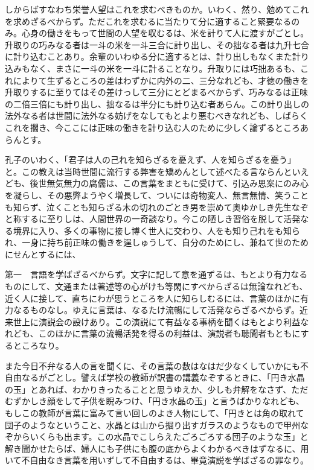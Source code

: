 \documentclass[a4paper, platex, dvipdfmx]{jsarticle}
\begin{document}
しからばすなわち栄誉人望はこれを求むべきものか。いわく、然り、勉めてこれを求めざるべからず。ただこれを求むるに当たりて分に適すること緊要なるのみ。心身の働きをもって世間の人望を収むるは、米を計りて人に渡すがごとし。升取りの巧みなる者は一斗の米を一斗三合に計り出し、その拙なる者は九升七合に計り込むことあり。余輩のいわゆる分に適するとは、計り出しもなくまた計り込みもなく、まさに一斗の米を一斗に計ることなり。升取りには巧拙あるも、これによりて生ずるところの差はわずかに内外の二、三分なれども、才徳の働きを升取りするに至りてはその差けっして三分にとどまるべからず、巧みなるは正味の二倍三倍にも計り出し、拙なるは半分にも計り込む者あらん。この計り出しの法外なる者は世間に法外なる妨げをなしてもとより悪むべきなれども、しばらくこれを擱き、今ここには正味の働きを計り込む人のために少しく論ずるところあらんとす。

孔子のいわく、「君子は人の己れを知らざるを憂えず、人を知らざるを憂う」と。この教えは当時世間に流行する弊害を矯めんとして述べたる言ならんといえども、後世無気無力の腐儒は、この言葉をまともに受けて、引込み思案にのみ心を凝らし、その悪弊ようやく増長して、ついには奇物変人、無言無情、笑うことも知らず、泣くことも知らざる木の切れのごとき男を崇めて奥ゆかしき先生なぞと称するに至りしは、人間世界の一奇談なり。今この陋しき習俗を脱して活発なる境界に入り、多くの事物に接し博く世人に交わり、人をも知り己れをも知られ、一身に持ち前正味の働きを逞しゅうして、自分のためにし、兼ねて世のためにせんとするには、

第一　言語を学ばざるべからず。文字に記して意を通ずるは、もとより有力なるものにして、文通または著述等の心がけも等閑にすべからざるは無論なれども、近く人に接して、直ちにわが思うところを人に知らしむるには、言葉のほかに有力なるものなし。ゆえに言葉は、なるたけ流暢にして活発ならざるべからず。近来世上に演説会の設けあり。この演説にて有益なる事柄を聞くはもとより利益なれども、このほかに言葉の流暢活発を得るの利益は、演説者も聴聞者もともにするところなり。

また今日不弁なる人の言を聞くに、その言葉の数はなはだ少なくしていかにも不自由なるがごとし。譬えば学校の教師が訳書の講義なぞするときに、「円き水晶の玉」とあれば、わかりきったることと思うゆえか、少しも弁解をなさず、ただむずかしき顔をして子供を睨みつけ、「円き水晶の玉」と言うばかりなれども、もしこの教師が言葉に富みて言い回しのよき人物にして、「円きとは角の取れて団子のようなということ、水晶とは山から掘り出すガラスのようなもので甲州なぞからいくらも出ます。この水晶でこしらえたごろごろする団子のような玉」と解き聞かせたらば、婦人にも子供にも腹の底からよくわかるべきはずなるに、用いて不自由なき言葉を用いずして不自由するは、畢竟演説を学ばざるの罪なり。
\end{document}
